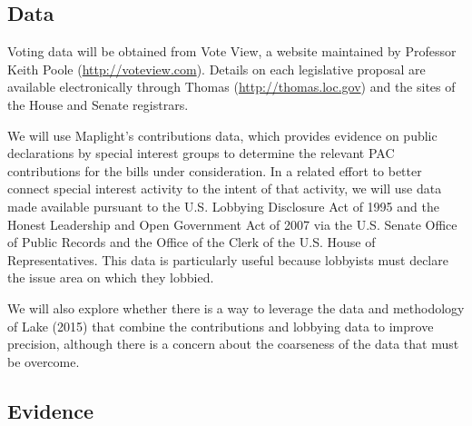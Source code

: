 \documentclass[12pt]{article}
\begin{document}
\subsection{Data}
Voting data will be obtained from Vote View, a website maintained by Professor Keith Poole (\url{http://voteview.com}). Details on each legislative proposal are available electronically through Thomas (\url{http://thomas.loc.gov}) and the sites of the House and Senate registrars.

We will use Maplight's contributions data, which provides evidence on public declarations by special interest groups to determine the relevant PAC contributions for the bills under consideration. In a related effort to better connect special interest activity to the intent of that activity, we will use data made available pursuant to the U.S. Lobbying Disclosure Act of 1995 and the Honest Leadership and Open Government Act of 2007 via the U.S. Senate Office of Public Records and the Office of the Clerk of the U.S. House of Representatives. This data is particularly useful because lobbyists must declare the issue area on which they lobbied.

We will also explore whether there is a way to leverage the data and methodology of Lake (2015) that combine the contributions and lobbying data to improve precision, although there is a concern about the coarseness of the data that must be overcome.

\subsection{Evidence}
\end{document}
